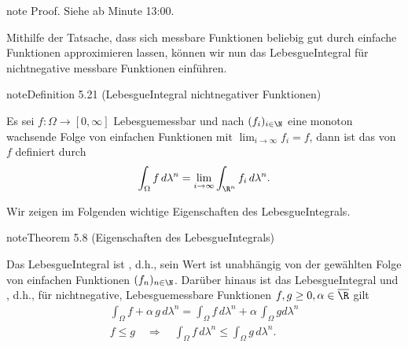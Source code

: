 \documentclass[letterpaper,10pt,german]{jupyterBook}
\begin{document}
\begin{sphinxadmonition}{note}
\sphinxAtStartPar
Proof. Siehe  ab Minute 13:00.
\end{sphinxadmonition}

\sphinxAtStartPar
Mithilfe der Tatsache, dass sich messbare Funktionen beliebig gut durch einfache Funktionen approximieren lassen, können wir nun das Lebesgue\sphinxhyphen{}Integral für nicht\sphinxhyphen{}negative messbare Funktionen einführen.
\label{masstheorie/lebesgue_integral:definition-12}
\begin{sphinxadmonition}{note}{Definition 5.21 (Lebesgue\sphinxhyphen{}Integral nicht\sphinxhyphen{}negativer Funktionen)}



\sphinxAtStartPar
Es sei \(f:\Omega\to[0,\infty]\) Lebesgue\sphinxhyphen{}messbar und nach {\hyperref[\detokenize{masstheorie/lebesgue_integral:lem:simplefun}]{}} \((f_i)_{i\in\N}\) eine monoton wachsende Folge von einfachen Funktionen mit \(\lim_{i\to\infty} f_i = f\), dann ist das  von \(f\) definiert durch
\begin{equation*}
\begin{split}\int_{\Omega} f \,d\lambda^n = \lim_{i\rightarrow \infty} \int_{\R^n} f_i \,d\lambda^n.\end{split}
\end{equation*}\end{sphinxadmonition}

\sphinxAtStartPar
Wir zeigen im Folgenden wichtige Eigenschaften des Lebesgue\sphinxhyphen{}Integrals.
\label{masstheorie/lebesgue_integral:theorem-13}
\begin{sphinxadmonition}{note}{Theorem 5.8 (Eigenschaften des Lebesgue\sphinxhyphen{}Integrals)}



\sphinxAtStartPar
Das Lebesgue\sphinxhyphen{}Integral ist , d.h., sein Wert ist unabhängig von der gewählten Folge von einfachen Funktionen \((f_n)_{n\in\N}\).
Darüber hinaus ist das Lebesgue\sphinxhyphen{}Integral  und , d.h., für nicht\sphinxhyphen{}negative, Lebesgue\sphinxhyphen{}messbare Funktionen \(f,g \geq 0,\alpha\in\overline{\R}\) gilt
\begin{equation*}
\begin{split}\int_\Omega f+\alpha\,g\,d\lambda^n = \int_\Omega f\,d\lambda^n + \alpha\, \int_\Omega g d\lambda^n\\
f \leq g \quad \Rightarrow \quad \int_\Omega f\, d\lambda^n \leq \int_\Omega g\, d\lambda^n.\end{split}
\end{equation*}\end{sphinxadmonition}
\end{document}

